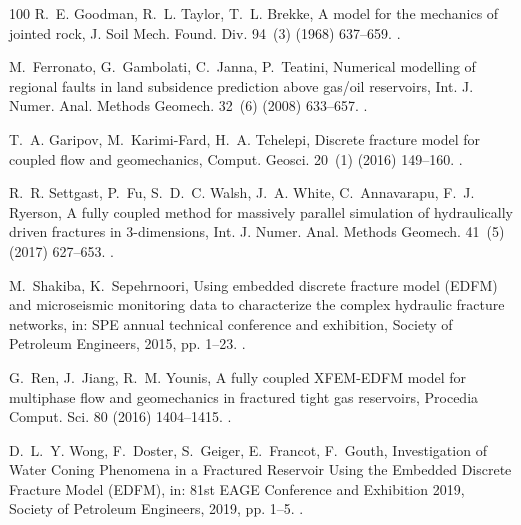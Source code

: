 \documentclass[3p,times]{elsarticle}
\theoremstyle{plain}
\begin{document}
\begin{thebibliography}{100}
R.~E. Goodman, R.~L. Taylor, T.~L. Brekke, {A model for the mechanics of
  jointed rock}, J. Soil Mech. Found. Div. 94~(3) (1968) 637--659.
\newblock \href {https://doi.org/10.1061/JSFEAQ.0001133}
  {}.

M.~Ferronato, G.~Gambolati, C.~Janna, P.~Teatini, {Numerical modelling of
  regional faults in land subsidence prediction above gas/oil reservoirs}, Int.
  J. Numer. Anal. Methods Geomech. 32~(6) (2008) 633--657.
\newblock \href {https://doi.org/10.1002/nag.640} {}.

T.~A. Garipov, M.~Karimi-Fard, H.~A. Tchelepi, {Discrete fracture model for
  coupled flow and geomechanics}, Comput. Geosci. 20~(1) (2016) 149--160.
\newblock \href {https://doi.org/10.1007/s10596-015-9554-z}
  {}.

R.~R. Settgast, P.~Fu, S.~D.~C. Walsh, J.~A. White, C.~Annavarapu, F.~J.
  Ryerson, {A fully coupled method for massively parallel simulation of
  hydraulically driven fractures in 3-dimensions}, Int. J. Numer. Anal. Methods
  Geomech. 41~(5) (2017) 627--653.
\newblock \href {https://doi.org/10.1002/nag.2557}
  {}.

M.~Shakiba, K.~Sepehrnoori, {Using embedded discrete fracture model (EDFM) and
  microseismic monitoring data to characterize the complex hydraulic fracture
  networks}, in: SPE annual technical conference and exhibition, Society of
  Petroleum Engineers, 2015, pp. 1--23.
\newblock \href {https://doi.org/10.2118/175142-MS}
  {}.

G.~Ren, J.~Jiang, R.~M. Younis, {A fully coupled XFEM-EDFM model for multiphase
  flow and geomechanics in fractured tight gas reservoirs}, Procedia Comput.
  Sci. 80 (2016) 1404--1415.
\newblock \href {https://doi.org/10.1016/j.procs.2016.05.449}
  {}.

D.~L.~Y. Wong, F.~Doster, S.~Geiger, E.~Francot, F.~Gouth, {Investigation of
  Water Coning Phenomena in a Fractured Reservoir Using the Embedded Discrete
  Fracture Model (EDFM)}, in: 81st EAGE Conference and Exhibition 2019, Society
  of Petroleum Engineers, 2019, pp. 1--5.
\newblock \href {https://doi.org/10.3997/2214-4609.201901303}
  {}.


\end{thebibliography}
\end{document}

